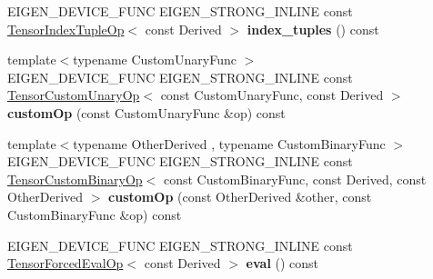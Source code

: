 \begin{DoxyCompactItemize}
\item 
\mbox{\label{class_eigen_1_1_tensor_base_3_01_derived_00_01_read_only_accessors_01_4_a88ffbfd5a893734ae8ee281026a9573a}} 
E\+I\+G\+E\+N\+\_\+\+D\+E\+V\+I\+C\+E\+\_\+\+F\+U\+NC E\+I\+G\+E\+N\+\_\+\+S\+T\+R\+O\+N\+G\+\_\+\+I\+N\+L\+I\+NE const \hyperlink{class_eigen_1_1_tensor_index_tuple_op}{Tensor\+Index\+Tuple\+Op}$<$ const Derived $>$ {\bfseries index\+\_\+tuples} () const
\item 
\mbox{\label{class_eigen_1_1_tensor_base_3_01_derived_00_01_read_only_accessors_01_4_acb888ea34ad7fa4ea35d713c08fed4d0}} 
{\footnotesize template$<$typename Custom\+Unary\+Func $>$ }\\E\+I\+G\+E\+N\+\_\+\+D\+E\+V\+I\+C\+E\+\_\+\+F\+U\+NC E\+I\+G\+E\+N\+\_\+\+S\+T\+R\+O\+N\+G\+\_\+\+I\+N\+L\+I\+NE const \hyperlink{class_eigen_1_1_tensor_custom_unary_op}{Tensor\+Custom\+Unary\+Op}$<$ const Custom\+Unary\+Func, const Derived $>$ {\bfseries custom\+Op} (const Custom\+Unary\+Func \&op) const
\item 
\mbox{\label{class_eigen_1_1_tensor_base_3_01_derived_00_01_read_only_accessors_01_4_ae4d6a96cd592d11c9b5cf05a20626bd4}} 
{\footnotesize template$<$typename Other\+Derived , typename Custom\+Binary\+Func $>$ }\\E\+I\+G\+E\+N\+\_\+\+D\+E\+V\+I\+C\+E\+\_\+\+F\+U\+NC E\+I\+G\+E\+N\+\_\+\+S\+T\+R\+O\+N\+G\+\_\+\+I\+N\+L\+I\+NE const \hyperlink{class_eigen_1_1_tensor_custom_binary_op}{Tensor\+Custom\+Binary\+Op}$<$ const Custom\+Binary\+Func, const Derived, const Other\+Derived $>$ {\bfseries custom\+Op} (const Other\+Derived \&other, const Custom\+Binary\+Func \&op) const
\item 
\mbox{\label{class_eigen_1_1_tensor_base_3_01_derived_00_01_read_only_accessors_01_4_abf8095f6660f4aee94307b485dfbe55e}} 
E\+I\+G\+E\+N\+\_\+\+D\+E\+V\+I\+C\+E\+\_\+\+F\+U\+NC E\+I\+G\+E\+N\+\_\+\+S\+T\+R\+O\+N\+G\+\_\+\+I\+N\+L\+I\+NE const \hyperlink{class_eigen_1_1_tensor_forced_eval_op}{Tensor\+Forced\+Eval\+Op}$<$ const Derived $>$ {\bfseries eval} () const
\end{DoxyCompactItemize}
